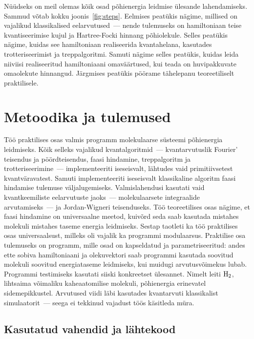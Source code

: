 \documentclass[12pt]{report}
\begin{document}
Nüüdseks on meil olemas kõik osad põhienergia leidmise ülesande lahendamiseks.
Sammud võtab kokku joonis~\ref{fig:steps}.
Eelmises peatükis nägime, millised on vajalikud klassikalised eelarvutused~--- nende tulemuseks on hamiltoniaan teise kvantiseerimise kujul ja Hartree-Focki hinnang põhiolekule.
Selles peatükis nägime, kuidas see hamiltoniaan realiseerida kvantahelana, kasutades trotteriseerimist ja treppalgoritmi.
Samuti nägime selles peatükis, kuidas leida niiviisi realiseeritud hamiltoniaani omaväärtused, kui teada on huvipakkuvate omaolekute hinnangud.
Järgmises peatükis pöörame tähelepanu teoreetiliselt praktilisele.

\chapter{Metoodika ja tulemused}\label{chap:results}

Töö praktilises osas valmis programm molekulaarse süsteemi põhienergia leidmiseks.
Kõik selleks vajalikud kvantalgoritmid~--- kvantarvutuslik Fourier' teisendus ja pöördteisendus, faasi hindamine, treppalgoritm ja trotteriseerimine~--- implementeeriti iseseisvalt, lähtudes vaid primitiivsetest kvantväravatest.
Samuti implementeeriti iseseisvalt klassikaline algoritm faasi hindamise tulemuse väljalugemiseks.
Valmislahendusi kasutati vaid kvantkeemiliste eelarvutuste jaoks~--- molekulaarsete integraalide arvutamiseks~--- ja Jordan-Wigneri teisenduseks.
Töö teoreetilises osas nägime, et faasi hindamine on universaalne meetod, kuivõrd seda saab kasutada mistahes molekuli mistahes taseme energia leidmiseks.
Sestap taotleti ka töö praktilises osas universaalsust, milleks oli vajalik ka programmi modulaarsus.
Praktilise osa tulemuseks on programm, mille osad on kapseldatud ja parametriseeritud: andes ette sobiva hamiltoniaani ja olekuvektori saab programmi kasutada soovitud molekuli soovitud energiataseme leidmiseks, kui muidugi arvutusvõimekus lubab.
Programmi testimiseks kasutati siiski konkreetset ülesannet.
Nimelt leiti \(\rm H_2\), lihtsaima võimaliku kaheaatomilise molekuli, põhienergia erinevatel sidemepikkustel.
Arvutused viidi läbi kasutades kvantarvuti klassikalist simulaatorit~--- seega  ei tekkinud vajadust töös käsitleda müra.

\section{Kasutatud vahendid ja lähtekood}
\end{document}
